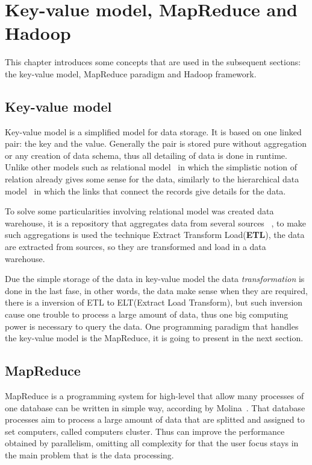 \chapter{Key-value model, MapReduce and Hadoop} %
\label{cha:background}

This chapter introduces some concepts that are used in the subsequent sections:
the key-value model, MapReduce paradigm and Hadoop framework.

\section{Key-value model}\label{section:mapreduce}

Key-value model is a simplified model for data storage. It is based on one linked
pair: the key and the value. Generally the pair is stored pure without aggregation or
any creation of data schema, thus all detailing of data is done in runtime. Unlike
other models such as relational model~\cite{codd:1970} in which the simplistic notion
of relation already gives some sense for the data, similarly to the hierarchical
data model~\cite{silber:2005} in which the links that connect the records give
details for the data.

To solve some particularities involving relational model was created data warehouse,
it is a repository that aggregates data from several sources ~\cite{silber:2005},
to make such aggregations is used the technique Extract Transform Load(\textbf{ETL}),
the data are extracted from sources, so they are transformed and load in a data
warehouse.

Due the simple storage of the data in key-value model the data \textit{transformation}
is done in the last fase, in other words, the data make sense when they are required,
there is a inversion of ETL to ELT(Extract Load Transform), but such inversion
cause one trouble to process a large amount of data, thus one big computing
power is necessary to query the data. One programming paradigm that handles the
key-value model is the MapReduce, it is going to present in the next section.

\section{MapReduce}\label{section:mapreduce}
MapReduce is a programming system for high-level that allow many processes of one
database can be written in simple way, according by Molina~\cite{molina:2009}.
That database processes aim to process a large amount of data that are splitted
and assigned to set computers, called computers cluster. Thus can improve the
performance obtained by parallelism, omitting all complexity for that the user
focus stays in the main problem that is the data processing.

